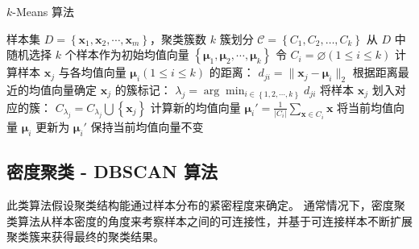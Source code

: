 \begin{algorithm}[H]
    \renewcommand{\algorithmicrequire}{\textbf{Input:}}
	\renewcommand{\algorithmicensure}{\textbf{Output:}}
    \caption{$k$-Means 算法}
    \begin{algorithmic}[1]
        \REQUIRE 样本集 $D = \left\{\boldsymbol{x}_1, \boldsymbol{x}_2, \cdots, \boldsymbol{x}_m\right\}$，聚类簇数 $k$
        \ENSURE 簇划分 $\mathcal C = \left\{C_1, C_2, \dots, C_k\right\}$
        \STATE 从 $D$ 中随机选择 $k$ 个样本作为初始均值向量 $\left\{\boldsymbol{\mu}_1, \boldsymbol{\mu}_2, \cdots, \boldsymbol{\mu}_k\right\}$
        \STATE 令 $C_i = \varnothing(1 \leq i \leq k)$
            \STATE 计算样本 $\boldsymbol{x}_j$ 与各均值向量 $\boldsymbol{\mu}_i(1 \leq i \leq k)$ 的距离：
            $d_{ji} = \|\boldsymbol{x}_j - \boldsymbol{\mu}_i\|_2$
            \STATE 根据距离最近的均值向量确定 $\boldsymbol{x}_j$ 的簇标记：
            $\lambda_j = \arg\min_{i \in \left\{1, 2, \cdots, k\right\}}d_{ji}$
            \STATE 将样本 $\boldsymbol{x}_j$ 划入对应的簇： 
            $C_{\lambda_j} = C_{\lambda_j} \bigcup \left\{\boldsymbol{x}_j\right\}$
        \ENDFOR
            \STATE 计算新的均值向量 
            $\boldsymbol{\mu}_i' = \frac 1{|C_i|}\sum_{\boldsymbol{x} \in C_i} \boldsymbol{x}$
                \STATE 将当前均值向量 $\boldsymbol{\mu}_i$ 更新为 $\boldsymbol{\mu}_i'$
            \ELSE
                \STATE 保持当前均值向量不变
            \ENDIF
        \ENDFOR
        \ENDWHILE
    \end{algorithmic}
\end{algorithm}

\subsection{密度聚类 - DBSCAN 算法}
此类算法假设聚类结构能通过样本分布的紧密程度来确定。
通常情况下，密度聚类算法从样本密度的角度来考察样本之间的可连接性，并基于可连接样本不断扩展聚类簇来获得最终的聚类结果。

